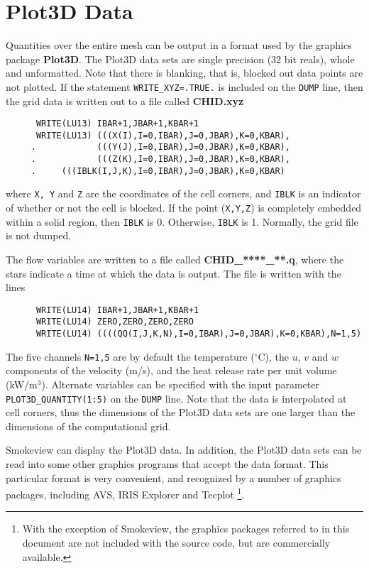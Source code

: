 \documentclass[11pt]{book}
\newcommand{\ct}{\tt\small}
\begin{document}
\section{Plot3D Data}
\label{out:PL3D}

Quantities over the entire mesh can be output in a format used by the graphics package {\bf Plot3D}.
The Plot3D data sets are single precision (32 bit reals), whole and
unformatted. Note that there is blanking, that is,
blocked out data points are not plotted.
If the statement {\ct WRITE\_XYZ=.TRUE.} is included on the {\ct DUMP}
line, then the grid data is written out to a file called {\bf CHID.xyz}

\footnotesize
\begin{verbatim}
      WRITE(LU13) IBAR+1,JBAR+1,KBAR+1
      WRITE(LU13) (((X(I),I=0,IBAR),J=0,JBAR),K=0,KBAR),
     .            (((Y(J),I=0,IBAR),J=0,JBAR),K=0,KBAR),
     .            (((Z(K),I=0,IBAR),J=0,JBAR),K=0,KBAR),
     .     (((IBLK(I,J,K),I=0,IBAR),J=0,JBAR),K=0,KBAR)
\end{verbatim}
\normalsize
where {\ct X, Y} and {\ct Z} are the coordinates of the cell corners,
and {\ct IBLK} is an indicator of whether or not the cell is blocked.
If the point ({\ct X,Y,Z}) is completely embedded within a solid region,
then {\ct IBLK} is 0. Otherwise, {\ct IBLK} is 1. Normally, the grid
file is not dumped.

The flow variables are written to a file called {\bf CHID\_****\_**.q},
where the stars indicate a time at which the data is output.
The file is written with the lines

\footnotesize
\begin{verbatim}
      WRITE(LU14) IBAR+1,JBAR+1,KBAR+1
      WRITE(LU14) ZERO,ZERO,ZERO,ZERO
      WRITE(LU14) ((((QQ(I,J,K,N),I=0,IBAR),J=0,JBAR),K=0,KBAR),N=1,5)
\end{verbatim}
\normalsize
The five channels {\ct N=1,5} are by default the temperature
($^\circ$C), the $u$, $v$ and
$w$ components of the velocity (m/s), and the heat release rate
per unit volume (kW/m$^3$). Alternate variables can be specified with
the input parameter {\ct PLOT3D\_QUANTITY(1:5)} on the {\ct DUMP} line.
Note that the data is interpolated at
cell corners, thus the dimensions of the Plot3D data sets are
one larger than the dimensions of the computational grid.

Smokeview can display the Plot3D data. In
addition, the Plot3D data sets can be read into some other graphics
programs that accept the data format.
This particular format is very convenient, and recognized by
a number of graphics packages, including AVS, IRIS Explorer
and Tecplot
\footnote{With the exception of Smokeview,
the graphics packages referred to in this document are
not included with the source code, but are commercially available.}.
\end{document}
